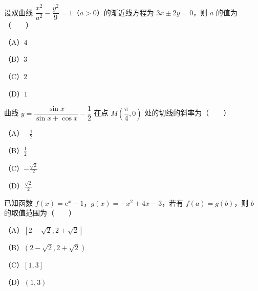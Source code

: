 \begin{question}
设双曲线 $\dfrac{x^2}{a^2}-\dfrac{y^2}9=1$（$a>0$）的渐近线方程为 $3x\pm2y=0$，则 $a$ 的值为\mbox{（　　）}

（A）$4$

（B）$3$

（C）$2$

（D）$1$

\end{question}
\begin{question}
曲线 $y=\dfrac{\sin x}{\sin x+\cos x}-\dfrac12$ 在点 $M\left(\dfrac\pi4,0\right)$ 处的切线的斜率为\mbox{（　　）}

（A）$-\frac12$

（B）$\frac12$

（C）$-\frac{\sqrt2}2$

（D）$\frac{\sqrt2}2$

\end{question}
\begin{question}
已知函数 $f(x)=\mathrm e^x-1$，$g(x)=-x^2+4x-3$，若有 $f(a)=g(b)$，则 $b$ 的取值范围为\mbox{（　　）}

（A）$[2-\sqrt2,2+\sqrt2]$

（B）$(2-\sqrt2,2+\sqrt2)$

（C）$[1,3]$

（D）$(1,3)$

\end{question}

